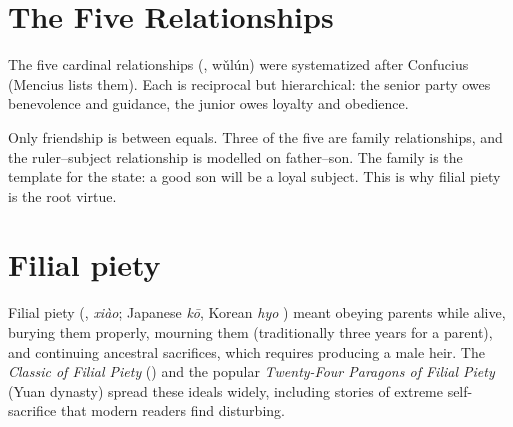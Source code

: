 \section{The Five Relationships}

The five cardinal relationships (, wǔlún) were systematized after Confucius
(Mencius lists them). Each is reciprocal but hierarchical: the senior party owes
benevolence and guidance, the junior owes loyalty and obedience.

\begin{center}
\end{center}

\begin{important}
Only friendship is between equals. Three of the five are family relationships, and the
ruler--subject relationship is modelled on father--son. The family is the template for the
state: a good son will be a loyal subject. This is why filial piety is the root virtue.
\end{important}

\section{Filial piety}

Filial piety (, \emph{xiào}; Japanese \emph{kō}, Korean \emph{hyo} )
meant obeying parents while alive, burying them properly, mourning them (traditionally
three years for a parent), and continuing ancestral sacrifices, which requires producing a
male heir. The \emph{Classic of Filial Piety} () and the popular
\emph{Twenty-Four Paragons of Filial Piety} (Yuan dynasty) spread these ideals widely,
including stories of extreme self-sacrifice that modern readers find disturbing.

